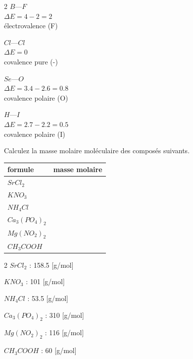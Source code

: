 \documentclass[
  11pt,
  a4paper,
  openany]{book}
\begin{document}
\begin{Answer}

\begin{multicols}{2}
\(B—F\)\\
\(\Delta E = 4 - 2 = 2\)\\
électrovalence (F)

\(Cl—Cl\)\\
\(\Delta E = 0\)\\
covalence pure (-)

\(Se—O\)\\
\(\Delta E = 3.4 - 2.6 = 0.8\)\\
covalence polaire (O)

\(H—I\)\\
\(\Delta E = 2.7 - 2.2 = 0.5\)\\
covalence polaire (I)

\end{multicols}

\end{Answer}

\begin{Exercise}
Calculez la masse molaire moléculaire des composés suivants.

\end{Exercise}

\begin{longtable}[]{@{}lc@{}}
\toprule\noalign{}
formule & masse molaire \\
\midrule\noalign{}
\endhead
\bottomrule\noalign{}
\endlastfoot
\(SrCl_2\) & \\
\(KNO_3\) & \\
\(NH_4Cl\) & \\
\(Ca_3(PO_4)_2\) & \\
\(Mg(NO_2)_2\) & \\
\(CH_3COOH\) & \\
\end{longtable}

\begin{Answer}

\begin{multicols}{2}
\(SrCl_2\) : 158.5 {[}g/mol{]}

\(KNO_3\) : 101 {[}g/mol{]}

\(NH_4Cl\) : 53.5 {[}g/mol{]}

\(Ca_3(PO_4)_2\) : 310 {[}g/mol{]}

\(Mg(NO_2)_2\) : 116 {[}g/mol{]}

\(CH_3COOH\) : 60 {[}g/mol{]}

\end{multicols}

\end{Answer}
\end{document}
